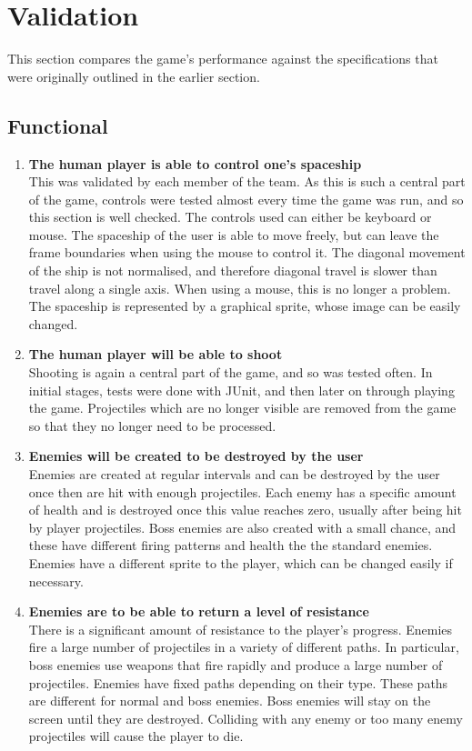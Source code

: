 \section{Validation}
This section compares the game's performance against the specifications that were originally outlined in the earlier section.
\subsection{Functional}
\begin{enumerate}
\item \textbf{The human player is able to control one's spaceship}\\
This was validated by each member of the team. As this is such a central part of the game, controls were tested almost every time the game was run, and so this section is well checked. The controls used can either be keyboard or mouse. The spaceship of the user is able to move freely, but can leave the frame boundaries when using the mouse to control it. The diagonal movement of the ship is not normalised, and therefore diagonal travel is slower than travel along a single axis. When using a mouse, this is no longer a problem. The spaceship is represented by a graphical sprite, whose image can be easily changed.
\item \textbf{The human player will be able to shoot}\\
Shooting is again a central part of the game, and so was tested often. In initial stages, tests were done with JUnit, and then later on through playing the game. Projectiles which are no longer visible are removed from the game so that they no longer need to be processed.
\item \textbf{Enemies will be created to be destroyed by the user}\\
Enemies are created at regular intervals and can be destroyed by the user once then are hit with enough projectiles. Each enemy has a specific amount of health and is destroyed once this value reaches zero, usually after being hit by player projectiles. Boss enemies are also created with a small chance, and these have different firing patterns and health the the standard enemies. Enemies have a different sprite to the player, which can be changed easily if necessary.
\item \textbf{Enemies are to be able to return a level of resistance}\\
There is a significant amount of resistance to the player's progress. Enemies fire a large number of projectiles in a variety of different paths. In particular, boss enemies use weapons that fire rapidly and produce a large number of projectiles. Enemies have fixed paths depending on their type. These paths are different for normal and boss enemies. Boss enemies will stay on the screen until they are destroyed. Colliding with any enemy or too many enemy projectiles will cause the player to die.

\end{enumerate}
